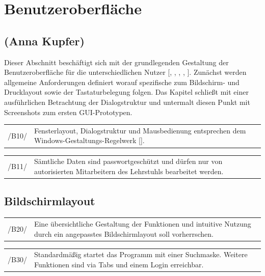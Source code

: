 \section{Benutzeroberfläche}
\label{sec:Benutzeroberfläche}

\subsection*{(Anna Kupfer)}

Dieser Abschnitt beschäftigt sich mit der grundlegenden Gestaltung der Benutzeroberfläche für die unterschiedlichen Nutzer [\cite{UniRos12b}, \cite{UniRos12c}, \cite{balz1996} \cite{Balzert2009}, \cite{Schae12}, \cite{Jurij07}]. Zunächst werden allgemeine Anforderungen definiert worauf spezifische zum Bildschirm- und Drucklayout sowie der Tastaturbelegung folgen. Das Kapitel schließt mit einer ausführlichen Betrachtung der Dialogstruktur und untermalt diesen Punkt mit Screenshots zum ersten GUI-Prototypen.


\begin{tabular}{p{1.5cm}p{14.5cm}}
 /B10/	& Fensterlayout, Dialogstruktur und Mausbedienung entsprechen dem Windows-Gestaltungs-Regelwerk [\cite{microsoft1995windows}]. \\[0.25cm]	 
\end{tabular}

\begin{tabular}{p{1.5cm}p{14.5cm}}
 /B11/	& Sämtliche Daten sind passwortgeschützt und dürfen nur von autorisierten Mitarbeitern des Lehrstuhls bearbeitet werden. \\[0.25cm]	 
\end{tabular}


\subsection{Bildschirmlayout}

\begin{tabular}{p{1.5cm}p{14.5cm}}
 /B20/	& Eine übersichtliche Gestaltung der Funktionen und intuitive Nutzung durch ein angepasstes Bildschirmlayout soll vorherrschen. \\[0.25cm]	 
\end{tabular}	

\begin{tabular}{p{1.5cm}p{14.5cm}}
 /B30/	& Standardmäßig startet das Programm mit einer Suchmaske. Weitere Funktionen sind via Tabs und einem Login erreichbar. \\[0.25cm]	 
\end{tabular}

